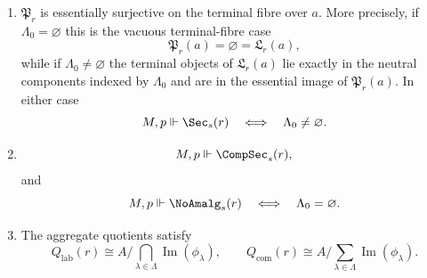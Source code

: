 \begin{theorem}
\begin{enumerate}[label=(\roman*),nosep]
\[
\omega_\lambda\in H^2(N,A)
\]
satisfying
\[
\mathrm{ev}_{\omega_\lambda}=\phi_\lambda,
\qquad
K_\lambda=\operatorname{Im}(\phi_\lambda).
\]
Consequently,
\[
\mathfrak G_\lambda\ \text{is neutral}
\quad\Longleftrightarrow\quad
\phi_\lambda=0.
\]
\item $\mathfrak P_r$ is essentially surjective on the terminal fibre over $a$. More precisely, if $\Lambda_0=\varnothing$ this is the vacuous terminal-fibre case
\[
\mathfrak P_r(a)=\varnothing=\mathfrak L_r(a),
\]
while if $\Lambda_0\neq\varnothing$ the terminal objects of $\mathfrak L_r(a)$ lie exactly in the neutral components indexed by $\Lambda_0$ and are in the essential image of $\mathfrak P_r(a)$. In either case
\[
M,p\Vdash \Sec_s(r)
\quad\Longleftrightarrow\quad
\Lambda_0\neq\varnothing.
\]
\item
\[
M,p\Vdash \CompSec_s(r),
\]
and
\[
M,p\Vdash \NoAmalg_s(r)
\quad\Longleftrightarrow\quad
\Lambda_0=\varnothing.
\]
\item The aggregate quotients satisfy
\[
Q_{\mathrm{lab}}(r)\cong A\Big/\bigcap_{\lambda\in\Lambda}\operatorname{Im}(\phi_\lambda),
\qquad
Q_{\mathrm{com}}(r)\cong A\Big/\sum_{\lambda\in\Lambda}\operatorname{Im}(\phi_\lambda).
\]
\end{enumerate}
\end{theorem}

